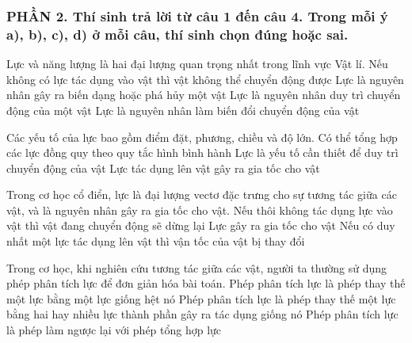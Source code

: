 \subsubsection*{PHẦN 2. Thí sinh trả lời từ câu 1 đến câu 4. Trong mỗi ý a), b), c), d) ở mỗi câu, thí sinh chọn đúng hoặc sai.}
\setcounter{ex}{0}
\begin{ex}%
Lực và năng lượng là hai đại lượng quan trọng nhất trong lĩnh vực Vật lí.
\choice
{Nếu không có lực tác dụng vào vật thì vật không thể chuyển động được}
{\True Lực là nguyên nhân gây ra biến dạng hoặc phá hủy một vật}
{Lực là nguyên nhân duy trì chuyển động của một vật}
{\True Lực là nguyên nhân làm biến đổi chuyển động của vật}
\loigiai{
\begin{itemchoice}
\itemch
\itemch
\itemch
\itemch
\end{itemchoice}
} 
\end{ex}
\begin{ex}%
Các yếu tố của lực bao gồm điểm đặt, phương, chiều và độ lớn.
{\True Có thể tổng hợp các lực đồng quy theo quy tắc hình bình hành}
{Lực là yếu tố cần thiết để duy trì chuyển động của vật}
{\True Lực tác dụng lên vật gây ra gia tốc cho vật}
\loigiai{
\begin{itemchoice}
\itemch
\itemch
\itemch
\itemch
\end{itemchoice}
} 
 \end{ex}
\begin{ex}%
Trong cơ học cổ điển, lực là đại lượng vectơ đặc trưng cho sự tương tác giữa các vật, và là nguyên nhân gây ra gia tốc cho vật. 
{Nếu thôi không tác dụng lực vào vật thì vật đang chuyển động sẽ dừng lại}
{\True Lực gây ra gia tốc cho vật}
{\True Nếu có duy nhất một lực tác dụng lên vật thì vận tốc của vật bị thay đổi}
\loigiai{
\begin{itemchoice}
\itemch
\itemch
\itemch
\itemch
\end{itemchoice}
} 
 \end{ex}
\begin{ex}%
Trong cơ học, khi nghiên cứu tương tác giữa các vật, người ta thường sử dụng phép phân tích lực để đơn giản hóa bài toán.
{Phép phân tích lực là phép thay thế một lực bằng một lực giống hệt nó}
{\True Phép phân tích lực là phép thay thế một lực bằng hai hay nhiều lực thành phần gây ra tác dụng giống nó}
{\True Phép phân tích lực là phép làm ngược lại với phép tổng hợp lực}
\loigiai{
\begin{itemchoice}
\itemch
\itemch
\itemch
\itemch
\end{itemchoice}
} 
 \end{ex}
\newpage 
{}
